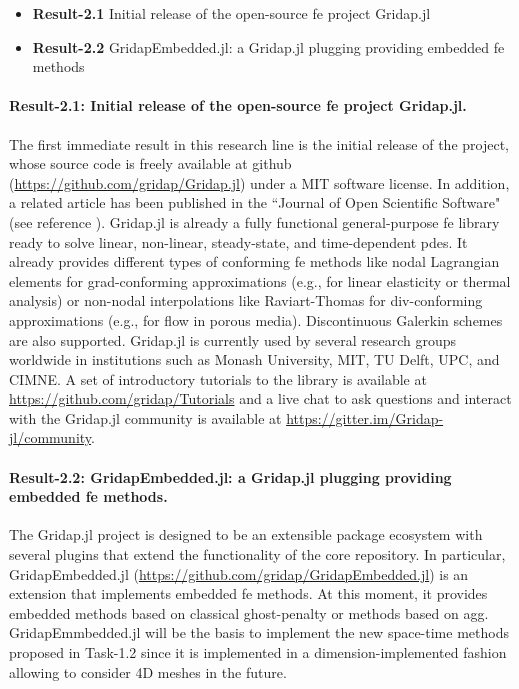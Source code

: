\documentclass{article}
\begin{document}
\begin{itemize}
\item {\bf Result-2.1} Initial release of the open-source \ac{fe} project Gridap.jl
\item {\bf Result-2.2} GridapEmbedded.jl: a Gridap.jl plugging providing embedded \ac{fe} methods
\end{itemize}

\paragraph*{Result-2.1: Initial release of the open-source \ac{fe} project Gridap.jl.} 

The first immediate result in this research line is the initial release of the project, whose source code is freely available at github (\url{https://github.com/gridap/Gridap.jl}) under a MIT software license. In addition, a related article  {has been published in the ``Journal of Open Scientific Software"} (see reference \cite{Badia2020}). Gridap.jl is already a fully functional general-purpose \ac{fe} library ready to solve linear, non-linear, steady-state, and time-dependent \acp{pde}. It already provides different types of conforming \ac{fe} methods like nodal Lagrangian elements for grad-conforming approximations (e.g., for linear elasticity or thermal analysis) or non-nodal interpolations like Raviart-Thomas for div-conforming approximations (e.g., for flow in porous media). Discontinuous Galerkin schemes are also supported. Gridap.jl is currently used by several research groups worldwide in institutions such as Monash University, MIT, TU Delft, UPC, and CIMNE. A set of introductory tutorials to the library is available at \url{https://github.com/gridap/Tutorials} and a live chat to ask questions and interact with the Gridap.jl community is available at \url{https://gitter.im/Gridap-jl/community}.

\paragraph*{Result-2.2: GridapEmbedded.jl: a Gridap.jl plugging providing embedded \ac{fe} methods.}

The Gridap.jl project is designed to be an extensible package ecosystem with several plugins that extend the functionality of the core repository. In particular, GridapEmbedded.jl (\url{https://github.com/gridap/GridapEmbedded.jl}) is an extension that implements embedded \ac{fe} methods. At this moment, it provides embedded methods based on classical ghost-penalty \cite{burman_cutfem:_2015} or methods based on \ac{agg}. GridapEmmbedded.jl will be the basis to implement the new space-time methods proposed in Task-1.2 since it is implemented in a dimension-implemented fashion allowing to consider 4D meshes in the future. 
\end{document}
